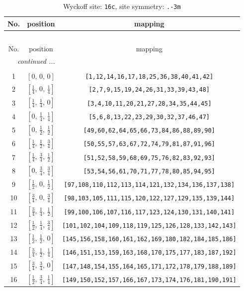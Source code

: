 \documentclass[fleqn,8pt]{jsarticle}
\begin{document}
\begin{longtable}{ccc}
\caption{Wyckoff site: {\tt 16c}, site symmetry: {\tt .-3m}}
 \\
 \hline \hline
No. & position & mapping \\ \hline \endfirsthead

\multicolumn{2}{l}{\tablename\ \thetable{}} \\
 \hline \hline
No. & position & mapping \\ \hline \endhead

 \hline \hline
\multicolumn{2}{r}{\footnotesize\it continued ...} \\ \endfoot

 \hline \hline
\multicolumn{2}{r}{} \\ \endlastfoot

1 & $\left[ 0,\, 0,\, 0 \right]$ & {\tt [1,12,14,16,17,18,25,36,38,40,41,42]} \\ \hline
2 & $\left[ \frac{1}{4},\, 0,\, \frac{1}{4} \right]$ & {\tt [2,7,9,15,19,24,26,31,33,39,43,48]} \\ \hline
3 & $\left[ \frac{1}{4},\, \frac{1}{4},\, 0 \right]$ & {\tt [3,4,10,11,20,21,27,28,34,35,44,45]} \\ \hline
4 & $\left[ 0,\, \frac{1}{4},\, \frac{1}{4} \right]$ & {\tt [5,6,8,13,22,23,29,30,32,37,46,47]} \\ \hline
5 & $\left[ 0,\, \frac{1}{2},\, \frac{1}{2} \right]$ & {\tt [49,60,62,64,65,66,73,84,86,88,89,90]} \\ \hline
6 & $\left[ \frac{1}{4},\, \frac{1}{2},\, \frac{3}{4} \right]$ & {\tt [50,55,57,63,67,72,74,79,81,87,91,96]} \\ \hline
7 & $\left[ \frac{1}{4},\, \frac{3}{4},\, \frac{1}{2} \right]$ & {\tt [51,52,58,59,68,69,75,76,82,83,92,93]} \\ \hline
8 & $\left[ 0,\, \frac{3}{4},\, \frac{3}{4} \right]$ & {\tt [53,54,56,61,70,71,77,78,80,85,94,95]} \\ \hline
9 & $\left[ \frac{1}{2},\, 0,\, \frac{1}{2} \right]$ & {\tt [97,108,110,112,113,114,121,132,134,136,137,138]} \\ \hline
10 & $\left[ \frac{3}{4},\, 0,\, \frac{3}{4} \right]$ & {\tt [98,103,105,111,115,120,122,127,129,135,139,144]} \\ \hline
11 & $\left[ \frac{3}{4},\, \frac{1}{4},\, \frac{1}{2} \right]$ & {\tt [99,100,106,107,116,117,123,124,130,131,140,141]} \\ \hline
12 & $\left[ \frac{1}{2},\, \frac{1}{4},\, \frac{3}{4} \right]$ & {\tt [101,102,104,109,118,119,125,126,128,133,142,143]} \\ \hline
13 & $\left[ \frac{1}{2},\, \frac{1}{2},\, 0 \right]$ & {\tt [145,156,158,160,161,162,169,180,182,184,185,186]} \\ \hline
14 & $\left[ \frac{3}{4},\, \frac{1}{2},\, \frac{1}{4} \right]$ & {\tt [146,151,153,159,163,168,170,175,177,183,187,192]} \\ \hline
15 & $\left[ \frac{3}{4},\, \frac{3}{4},\, 0 \right]$ & {\tt [147,148,154,155,164,165,171,172,178,179,188,189]} \\ \hline
16 & $\left[ \frac{1}{2},\, \frac{3}{4},\, \frac{1}{4} \right]$ & {\tt [149,150,152,157,166,167,173,174,176,181,190,191]} \\
\end{longtable}
\end{document}
